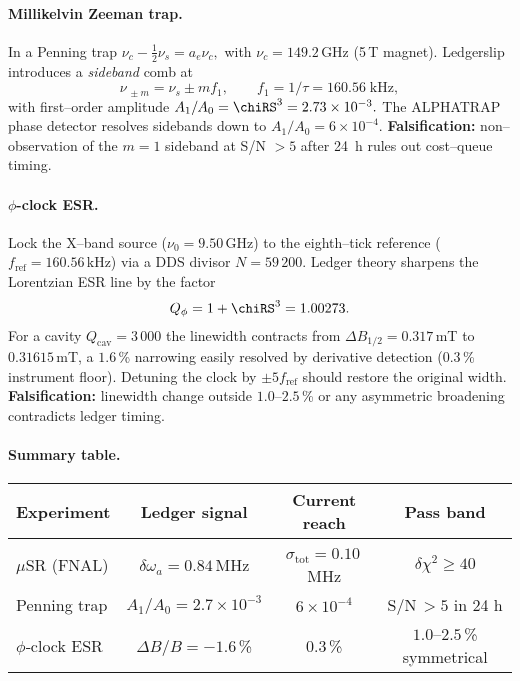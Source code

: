\documentclass[11pt,oneside]{book}
\begin{document}
\paragraph{Millikelvin Zeeman trap.}

In a Penning trap
\(
  \nu_{c}-\tfrac12\nu_{s}=a_{e}\nu_{c},
\)
with $\nu_{c}=149.2$\,GHz (5\,T magnet).  
Ledgerslip introduces a \textit{sideband} comb at  
%
\[
   \nu_{\,\pm m}=\nu_{s}\pm m f_{1},
   \qquad
   f_{1}=1/\tau=160.56\;\text{kHz},
\]
%
with first–order amplitude
$
  A_{1}/A_{0}=\chiRS^{3}=2.73\times10^{-3}.
$
The ALPHATRAP phase detector resolves sidebands down to
$A_{1}/A_{0}=6\times10^{-4}$.
\textbf{Falsification:} non–observation of the $m\!=\!1$
sideband at S/N $>5$ after \SI{24}{h} rules out cost–queue timing.

\paragraph{\texorpdfstring{$\phi$}{\textphi}-clock ESR.}

Lock the X–band source ($\nu_{0}=9.50$\,GHz) to the eighth–tick
reference ($f_{\text{ref}}=160.56$\,kHz) via a DDS divisor
$N=59\,200$.  
Ledger theory sharpens the Lorentzian ESR line by the factor  
%
\[
   Q_{\phi} = 1+\chiRS^{3}=1.00273.
\]
%
For a cavity $Q_{\text{cav}}=3\,000$ the linewidth contracts from
$\Delta B_{1/2}=0.317$\,mT to $0.31615$\,mT, a $1.6$\,\% narrowing
easily resolved by derivative detection ($0.3$\,\% instrument floor).
Detuning the clock by $\pm5f_{\text{ref}}$ should restore the original
width.  
\textbf{Falsification:} linewidth change outside
$1.0$–$2.5$\,\% or any asymmetric broadening contradicts ledger timing.

\paragraph{Summary table.}

\begin{center}\small
\renewcommand{\arraystretch}{1.1}
\begin{tabular}{lccc}
\toprule
Experiment & Ledger signal & Current reach & Pass band \\ \midrule
$\mu$SR (FNAL) & $\delta\omega_{a}=0.84$\,MHz & $\sigma_{\text{tot}}=0.10$\,MHz & $\delta\chi^{2}\ge40$ \\
Penning trap & $A_{1}/A_{0}=2.7\times10^{-3}$ & $6\times10^{-4}$ & S/N\,$>5$ in 24 h \\
$\phi$‐clock ESR & $\Delta B/B=-1.6$\,\% & $0.3$\,\% & $1.0$–$2.5$\,\% symmetrical \\ \bottomrule
\end{tabular}
\end{center}
\end{document}
